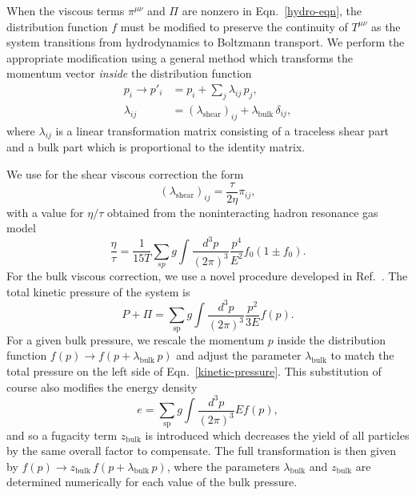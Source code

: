 \documentclass[aps,prc,reprint,amsmath,nofootinbib]{revtex4-1}
\begin{document}
When the viscous terms $\pi^{\mu\nu}$ and $\Pi$ are nonzero in Eqn.~\eqref{hydro-eqn}, the distribution function $f$ must be modified to preserve the continuity of $T^{\mu\nu}$ as the system transitions from hydrodynamics to Boltzmann transport.
We perform the appropriate modification using a general method which transforms the momentum vector \emph{inside} the distribution function \cite{Pratt:2010jt}
\begin{align}
  \label{viscous_correction}
  p_i \rightarrow p'_i &= p_i + \sum\limits_j \lambda_{ij}\, p_j,\\
  \lambda_{ij} &= (\lambda_\mathrm{shear})_{ij} + \lambda_\mathrm{bulk}\, \delta_{ij},
\end{align}
where $\lambda_{ij}$ is a linear transformation matrix consisting of a traceless shear part and a bulk part which is proportional to the identity matrix.

We use for the shear viscous correction the form \cite{Pratt:2010jt}
\begin{equation}
  (\lambda_\mathrm{shear})_{ij} = \frac{\tau}{2 \eta} \pi_{ij},
\end{equation}
with a value for $\eta/\tau$ obtained from the noninteracting hadron resonance gas model
\begin{equation}
  \frac{\eta}{\tau} = \frac{1}{15 T} \sum\limits_{sp} g \int \frac{d^3p}{(2\pi)^3}\frac{p^4}{E^2} f_0 (1 \pm f_0).
\end{equation}
For the bulk viscous correction, we use a novel procedure developed in Ref.~\cite{Bernhard:2018hnz}.
The total kinetic pressure of the system is
\begin{equation}
  \label{kinetic-pressure}
  P + \Pi = \sum\limits_\mathrm{sp} g \int \frac{d^3p}{(2\pi)^3} \frac{p^2}{3E} f(p).
\end{equation}
For a given bulk pressure, we rescale the momentum $p$ inside the distribution function $f(p) \rightarrow f(p + \lambda_\mathrm{bulk}\, p)$ and adjust the parameter $\lambda_\mathrm{bulk}$ to match the total pressure on the left side of Eqn.~\eqref{kinetic-pressure}.
This substitution of course also modifies the energy density
\begin{equation}
  e = \sum\limits_\mathrm{sp} g \int \frac{d^3p}{(2 \pi)^3} E f(p),
\end{equation}
and so a fugacity term $z_\mathrm{bulk}$ is introduced which decreases the yield of all particles by the same overall factor to compensate.
The full transformation is then given by $f(p) \rightarrow z_\mathrm{bulk}\, f(p + \lambda_\mathrm{bulk}\, p)$, where the parameters $\lambda_\mathrm{bulk}$ and $z_\mathrm{bulk}$ are determined numerically for each value of the bulk pressure.
\end{document}
